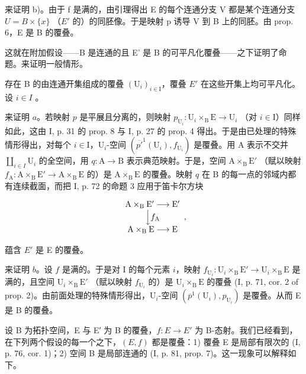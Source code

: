 来证明 b)。由于 f 是满的，由引理得出 E 的每个连通分支 V 都是某个连通分支 \(U = B \times \{x\}\) （\(E'\) 的）的同胚像。于是映射 p 诱导 V 到 B 上的同胚。由 prop. 6，E 是 B 的覆叠。

这就在附加假设——B 是连通的且 E' 是 B 的可平凡化覆叠——之下证明了命题。来证明一般情形。

存在 B 的由连通开集组成的覆叠 \((\mathrm{U}_{i})_{i\in\mathrm{I}}\)，覆叠 \(E'\) 在这些开集上均可平凡化。设 \(i\in I\) 。

来证明 \(a\)。若映射 \(p\) 是平展且分离的，则映射 \(p_{\mathrm{U}_i}\colon \mathrm{U}_i\times_{\mathrm{B}}\mathrm{E}\to \mathrm{U}_i\) （对 \(i\in \mathrm{I}\)）同样如此，这由 I, p. 31 的 prop. 8 与 I, p. 27 的 prop. 4 得出。于是由已处理的特殊情形得出，对每个 \(i\in \mathrm{I}\)，\(\mathrm{U}_i\)-空间 \((\overline{p'}^{1}(\mathrm{U}_i),f_{\mathrm{U}_i})\) 是覆叠。用 A 表示不交并 \(\coprod_{i\in I}\mathrm{U}_i\) 的全空间，用 \(q\colon \mathrm{A}\to \mathrm{B}\) 表示典范映射。于是，空间 \(\mathrm{A}\times_{\mathrm{B}}\mathrm{E}'\) （赋以映射 \(f_{\mathrm{A}}\colon \mathrm{A}\times_{\mathrm{B}}\mathrm{E}'\to \mathrm{A}\times_{\mathrm{B}}\mathrm{E}\) 的）是 \(\mathrm{A}\times_{\mathrm{B}}\mathrm{E}\) 的覆叠。映射 \(q\) 在 B 的每一点的邻域内都有连续截面，而把 I, p. 72 的命题 3 应用于笛卡尔方块

\[
\begin{array}{c} \mathrm {A\times_ {B} E^ {\prime}} \longrightarrow \mathrm {E^ {\prime}} \\ \Big \downarrow f _ {\mathrm{A}} \\ \mathrm {A\times_ {B} E} \longrightarrow \mathrm{E} \end{array} ,
\]

蕴含 \(E'\) 是 E 的覆叠。

来证明 \(b\)。设 \(f\) 是满的。于是对 I 的每个元素 \(i\)，映射 \(f_{\mathrm{U}_i}\colon \mathrm{U}_i\times_{\mathrm{B}}\mathrm{E}'\to \mathrm{U}_i\times_{\mathrm{B}}\mathrm{E}\) 是满的，且空间 \(\mathrm{U}_i\times_{\mathrm{B}}\mathrm{E}'\) （赋以映射 \(f_{\mathrm{U}_i}\) 的）是 \(\mathrm{U}_i\times_{\mathrm{B}}\mathrm{E}\) 的覆叠 (I, p. 71, cor. 2 of prop. 2)。由前面处理的特殊情形得出，\(\mathrm{U}_i\)-空间 \((\overline{p}^{1}(\mathrm{U}_{i}),p_{\mathrm{U}_{i}})\) 是覆叠。从而 E 是 B 的覆叠。

设 B 为拓扑空间，E 与 E′ 为 B 的覆叠，\(f: E \rightarrow E'\) 为 B-态射。我们已经看到，在下列两个假设的每一个之下，\((E, f)\) 都是覆叠：1) 覆叠 E 是局部有限次的 (I, p. 76, cor. 1)；2) 空间 B 是局部连通的 (I, p. 81, prop. 7)。这一现象可以解释如下。

